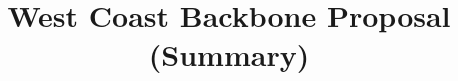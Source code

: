 \documentclass{apaper}
\begin{document}
\title{West Coast Backbone Proposal (Summary)}
\maketitle


\clearpage

\end{document}
